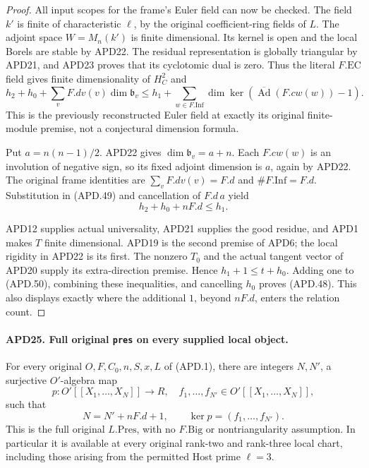 \begin{proof}
All input scopes for the frame's Euler field can now be checked.
The field \(k'\) is finite of characteristic \(\ell\), by
the original coefficient-ring fields of \(L\).  The adjoint
space \(W=M_n(k')\) is finite dimensional.  Its kernel is
open and the local Borels are stable by APD22.  The residual
representation is globally triangular by APD21, and APD23
proves that its cyclotomic dual is zero.  Thus the literal
\(F.\mathrm{EC}\) field gives finite dimensionality of
\(H_C^2\) and
\[
 h_2+h_0+\sum_v F.dv(v)\dim\mathfrak b_v
        \le h_1+\sum_{w\in F.\mathrm{Inf}}
             \dim\ker(\overline{\operatorname{Ad}}(F.cw(w))-1).
                                                               \tag{APD.49}
\]
This is the previously reconstructed Euler field at exactly its
original finite-module premise, not a conjectural dimension formula.

Put \(a=n(n-1)/2\).  APD22 gives
\(\dim\mathfrak b_v=a+n\).  Each \(F.cw(w)\) is an
involution of negative sign, so its fixed adjoint dimension is
\(a\), again by APD22.  The original frame identities are
\(\sum_v F.dv(v)=F.d\) and
\(\#F.\mathrm{Inf}=F.d\).  Substitution in (APD.49)
and cancellation of \(F.d\,a\) yield
\[
                         h_2+h_0+nF.d\le h_1.             \tag{APD.50}
\]

APD12 supplies actual universality, APD21 supplies the good
residue, and APD1 makes \(T\) finite dimensional.  APD19
is the second premise of APD6; the local rigidity in APD22
is its first.  The nonzero \(T_0\) and the actual tangent
vector of APD20 supply its extra-direction premise.  Hence
\(h_1+1\le t+h_0\).  Adding one to (APD.50), combining
these inequalities, and cancelling \(h_0\) proves (APD.48).
This also displays exactly where the additional \(1\), beyond
\(nF.d\), enters the relation count.
\end{proof}

\paragraph{APD25. Full original \texttt{pres} on every supplied local object.}
\label{claim:APD25}
For every original \(O,F,C_0,n,S,x,L\) of (APD.1), there
are integers \(N,N'\), a surjective \(O'\)-algebra map
\[
 p:O'[[X_1,\ldots,X_N]]\longrightarrow R,
 \quad f_1,\ldots,f_{N'}\in O'[[X_1,\ldots,X_N]],
\]
such that
\[
            N=N'+nF.d+1,\qquad \ker p=(f_1,\ldots,f_{N'}).
                                                               \tag{APD.51}
\]
This is the full original \(L.\mathrm{Pres}\), with no
\(F.\mathrm{Big}\) or nontriangularity assumption.  In particular
it is available at every original rank-two and rank-three local
chart, including those arising from the permitted Host prime
\(\ell=3\).

